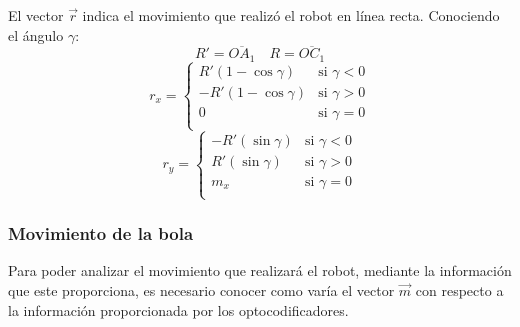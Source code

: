 \documentclass[10pt,a4paper,hidelinks]{article}
\begin{document}
\begin{multicols}{2}
\begin{center}
\end{center}

El vector $ \vec{r} $ indica el movimiento que realizó el robot en línea recta.
Conociendo el ángulo $\gamma$:
$$ R' = \overline{OA_1} \quad R = \overline{OC_1} $$
$$
r_x = \begin{cases}
		R'(1-\cos \gamma) & \text{si } \gamma < 0\\
		-R'(1-\cos \gamma) & \text{si } \gamma > 0\\
		0 & \text{si } \gamma = 0\\
	\end{cases}
$$
$$
r_y = \begin{cases}
		-R'(\sin \gamma) & \text{si } \gamma < 0\\
		R'(\sin \gamma) & \text{si } \gamma > 0\\
		m_x & \text{si } \gamma = 0\\
	\end{cases}
$$
\subsubsection{Movimiento de la bola}
Para poder analizar el movimiento que realizará el robot, mediante la 
información que este proporciona, es necesario conocer como varía el vector 
$\vec{m}$ con respecto a la información proporcionada por los optocodificadores.


\end{multicols}
\end{document}

